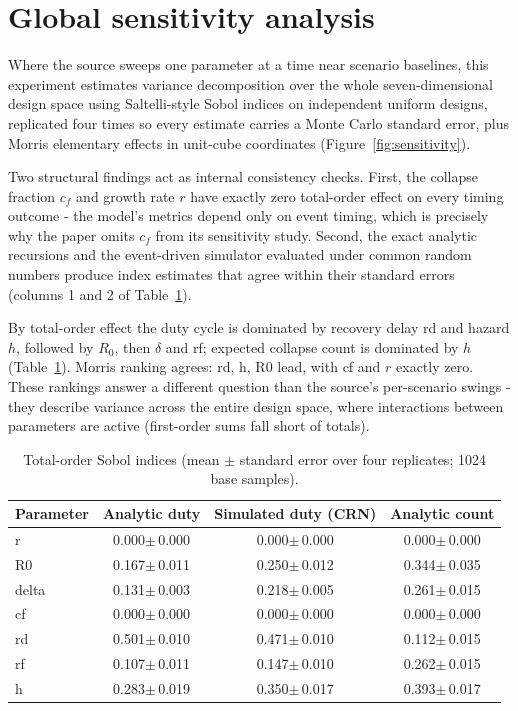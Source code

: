 \documentclass[11pt]{article}
\begin{document}
\section{Global sensitivity analysis}
\label{sec:sensitivity}

Where the source sweeps one parameter at a time near scenario baselines, this experiment
estimates variance decomposition over the whole seven-dimensional design space using
Saltelli-style Sobol indices on independent uniform designs, replicated four times so
every estimate carries a Monte Carlo standard error, plus Morris elementary effects in
unit-cube coordinates (Figure~\ref{fig:sensitivity}).

Two structural findings act as internal consistency checks. First, the collapse fraction
$c_f$ and growth rate $r$ have exactly zero total-order effect on every timing outcome -
the model's metrics depend only on event timing, which is precisely why the paper omits
$c_f$ from its sensitivity study. Second, the exact analytic recursions and the
event-driven simulator evaluated under common random numbers produce index estimates
that agree within their standard errors (columns 1 and 2 of
Table~\ref{tab:sobol}).

By total-order effect the duty cycle is dominated by recovery delay rd and hazard $h$,
followed by $R_0$, then $\delta$ and rf; expected collapse count is dominated by $h$
(Table~\ref{tab:sobol}). Morris ranking agrees: rd, h, R0 lead, with
cf and $r$ exactly zero. These rankings answer a different question than the source's
per-scenario swings - they describe variance across the entire design space, where
interactions between parameters are active (first-order sums fall short of totals).

\begin{table}[ht]
\centering
\caption{Total-order Sobol indices (mean $\pm$ standard error over four replicates;
1024 base samples).}
\small
\begin{tabular}{lccc}
\toprule
Parameter & Analytic duty & Simulated duty (CRN) & Analytic count \\
\midrule
r & 0.000$\pm$\,0.000 & 0.000$\pm$\,0.000 & 0.000$\pm$\,0.000 \\
R0 & 0.167$\pm$\,0.011 & 0.250$\pm$\,0.012 & 0.344$\pm$\,0.035 \\
delta & 0.131$\pm$\,0.003 & 0.218$\pm$\,0.005 & 0.261$\pm$\,0.015 \\
cf & 0.000$\pm$\,0.000 & 0.000$\pm$\,0.000 & 0.000$\pm$\,0.000 \\
rd & 0.501$\pm$\,0.010 & 0.471$\pm$\,0.010 & 0.112$\pm$\,0.015 \\
rf & 0.107$\pm$\,0.011 & 0.147$\pm$\,0.010 & 0.262$\pm$\,0.015 \\
h & 0.283$\pm$\,0.019 & 0.350$\pm$\,0.017 & 0.393$\pm$\,0.017 \\
\bottomrule
\end{tabular}
\label{tab:sobol}
\end{table}
\end{document}
